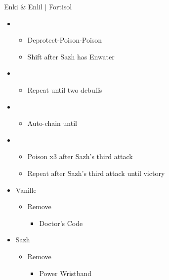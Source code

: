 \begin{battle}{Enki \& Enlil $|$ Fortisol}
\begin{multicols}{2}
\begin{itemize}
    \item \third
    \begin{itemize}
        \item Deprotect-Poison-Poison
        \item Shift after Sazh has Enwater
    \end{itemize}
    \item \fifth
    \begin{itemize}
        \item Repeat until two debuffs
    \end{itemize}
    \item \fourth
    \begin{itemize}
        \item Auto-chain until \stagger
    \end{itemize}
    \item \sixth
    \begin{itemize}
        \item Poison x3 after Sazh's third attack
        \item Repeat after Sazh's third attack until victory
    \end{itemize}
\end{itemize}
\vfill\null
\end{multicols}
\end{battle}
\begin{menu}
\begin{itemize}
    \equip
    \begin{itemize}
        \item Vanille
        \begin{itemize}
            \item Remove
            \begin{itemize}
                \item Doctor's Code
            \end{itemize}
        \end{itemize}
        \item Sazh
        \begin{itemize}
            \item Remove
            \begin{itemize}
                \item Power Wristband
            \end{itemize}
        \end{itemize}
    \end{itemize}
\end{itemize}
\end{menu}